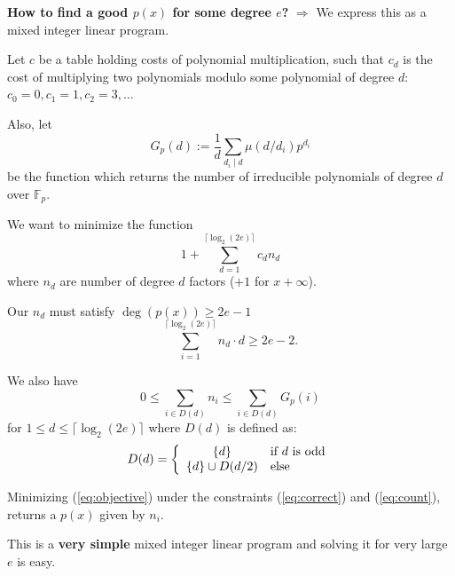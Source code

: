 \documentclass[11pt]{beamer}
\newcommand{\field}[1]{\mathbb{#1}}
\newcommand{\F}{\ensuremath{\field{F}}\xspace}
\newcommand{\memph}[1]{{\color{dredcolor}\bf #1}}
\begin{document}
\begin{frame}[allowframebreaks]
\textbf{How to find a good  $p(x)$ for some degree $e$?} $\Rightarrow$ We express this as a mixed integer linear program. 

\vspace{1em}

Let $c$ be a table holding costs of polynomial multiplication, such that $c_d$ is the cost of multiplying two polynomials modulo some polynomial of degree $d$: $c_0 = 0, c_1 = 1, c_2 = 3, \dots$

\vspace{1em}

Also, let $$G_p(d) := \frac{1}{d} \sum_{d_i \mid d} \mu(d/d_i)p^{d_i}$$ be the function which returns the number of irreducible polynomials of degree $d$ over $\F_p$.

\framebreak

We want to minimize the function 
\begin{equation}
\label{eq:objective}
1 + \sum_{d=1}^{\lceil \log_2(2e)\rceil} c_dn_d
\end{equation}
where $n_d$ are number of degree $d$ factors ($+1$ for $x+\infty$). 

\vspace{1em}

Our $n_d$ must satisfy $\deg(p(x)) \geq 2e-1$
\begin{equation}
\label{eq:correct}
 \sum_{i=1}^{\lceil \log_2(2e)\rceil} n_d\cdot d  \geq 2e-2.
\end{equation}

\framebreak

We also have
\begin{equation}
\label{eq:count}
0 \leq \sum_{i \in D(d)} n_i \leq \sum_{i \in D(d)} G_p(i)
\end{equation}
for $1 \leq d \leq \lceil \log_2(2e)\rceil$ where $D(d)$ is defined as:
\begin{equation*}
D(d) = \left\{ \begin{array}{cl}\{d\} &\textnormal{if } d \textnormal{ is odd}\\\{d\} \cup D(d/2) & \textnormal{else } \end{array}\right.
\end{equation*}

Minimizing (\ref{eq:objective}) under the constraints (\ref{eq:correct}) and (\ref{eq:count}), returns a $p(x)$ given by $n_i$. 

\vspace{1em}

This is a \memph{very simple} mixed integer linear program and solving it for very large $e$ is easy.


\end{frame}
\end{document}
